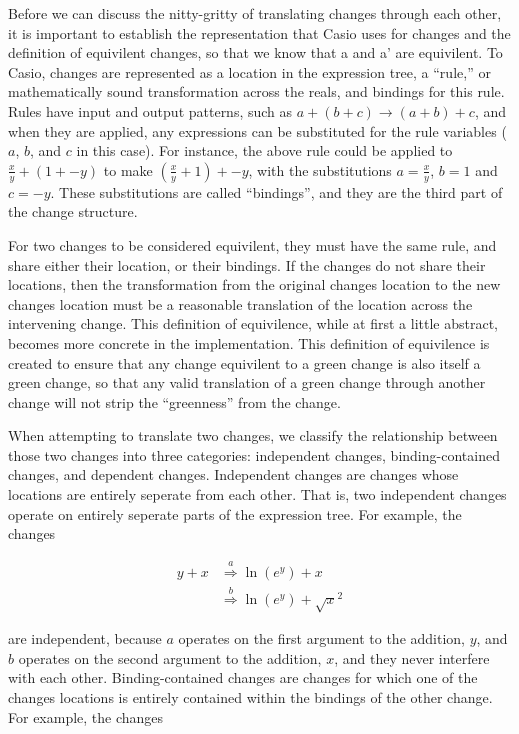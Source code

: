 \documentclass{article}
\newcommand{\insetarrow}[1]{\stackrel{#1}{\Rightarrow}}
\newcommand{\lnexp}[1]{\ln{\left(e^{#1}\right)}}
\begin{document}
Before we can discuss the nitty-gritty of translating changes through each other, 
it is important to establish the representation that Casio uses for changes 
and the definition of equivilent changes, 
so that we know that a and a' are equivilent. 
To Casio, changes are represented as a location in the expression tree, 
a ``rule,'' or mathematically sound transformation across the reals, 
and bindings for this rule. 
Rules have input and output patterns, 
such as $a + (b + c) \to (a + b) + c$,
and when they are applied, 
any expressions can be substituted for the rule variables 
($a$, $b$, and $c$ in this case). 
For instance, 
the above rule could be applied 
to $\frac{x}{y} + (1 + -y)$ 
to make $(\frac{x}{y} + 1) + -y$, 
with the substitutions $a = \frac{x}{y}$, $b = 1$ and $c = -y$. 
These substitutions are called ``bindings'', 
and they are the third part of the change structure.

For two changes to be considered equivilent, 
they must have the same rule, 
and share either their location, 
or their bindings. 
If the changes do not share their locations, 
then the transformation from the original changes location 
to the new changes location must be a reasonable translation 
of the location across the intervening change. 
This definition of equivilence, 
while at first a little abstract, 
becomes more concrete in the implementation. 
This definition of equivilence is created to ensure 
that any change equivilent to a green change 
is also itself a green change, 
so that any valid translation of a green change 
through another change 
will not strip the ``greenness'' from the change.

When attempting to translate two changes, 
we classify the relationship between those two changes 
into three categories: 
independent changes, 
binding-contained changes, 
and dependent changes. 
Independent changes are changes whose locations 
are entirely seperate from each other. 
That is, 
two independent changes operate 
on entirely seperate parts 
of the expression tree. 
For example, 
the changes 

\begin{align*}
y + x &\insetarrow{a} \lnexp{y} + x \\
&\insetarrow{b} \lnexp{y} + \sqrt{x}^2
\end{align*}

are independent, 
because $a$ operates 
on the first argument to the addition, 
$y$, 
and $b$ operates 
on the second argument to the addition, 
$x$, 
and they never interfere with each other. 
Binding-contained changes are changes 
for which one of the changes locations 
is entirely contained within the bindings of the other change. 
For example, 
the changes 
\end{document}
